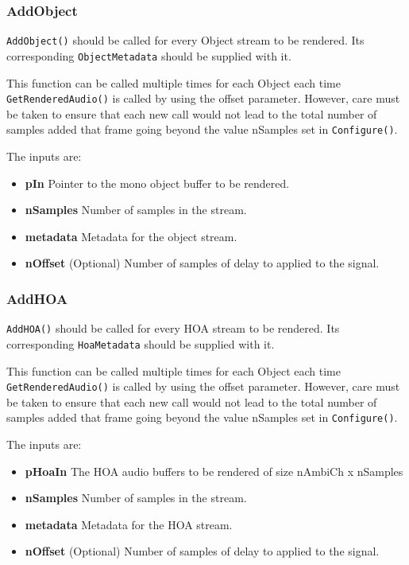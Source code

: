 \documentclass[12pt]{report}
\newcommand{\code}[1]{\texttt{#1}}
\begin{document}
\subsubsection{AddObject}

\code{AddObject()} should be called for every Object stream to be rendered. Its corresponding \code{ObjectMetadata} should be supplied with it.

This function can be called multiple times for each Object each time \code{GetRenderedAudio()} is called by using the offset parameter.
However, care must be taken to ensure that each new call would not lead to the total number of samples added that frame going beyond the value nSamples set in \code{Configure()}.

The inputs are:
\begin{itemize}
    \item \textbf{pIn} Pointer to the mono object buffer to be rendered.
    \item \textbf{nSamples} Number of samples in the stream.
    \item \textbf{metadata} Metadata for the object stream.
    \item \textbf{nOffset} (Optional) Number of samples of delay to applied to the signal.
\end{itemize}

\subsubsection{AddHOA}

\code{AddHOA()} should be called for every HOA stream to be rendered. Its corresponding \code{HoaMetadata} should be supplied with it.

This function can be called multiple times for each Object each time \code{GetRenderedAudio()} is called by using the offset parameter.
However, care must be taken to ensure that each new call would not lead to the total number of samples added that frame going beyond the value nSamples set in \code{Configure()}.

The inputs are:
\begin{itemize}
    \item \textbf{pHoaIn} The HOA audio buffers to be rendered of size nAmbiCh x nSamples
    \item \textbf{nSamples} Number of samples in the stream.
    \item \textbf{metadata} Metadata for the HOA stream.
    \item \textbf{nOffset} (Optional) Number of samples of delay to applied to the signal.
\end{itemize}
\end{document}
